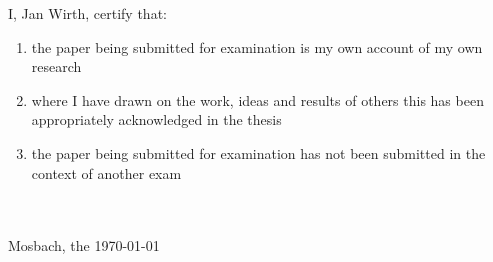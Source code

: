   
I, Jan Wirth, certify that:

\begin{enumerate}
  \item the paper being submitted for examination is my own account of my own research
  \item where I have drawn on the work, ideas and results of others this has been appropriately acknowledged in the thesis
  \item the paper being submitted for examination has not been submitted in the context of another exam
\end{enumerate}

\vspace{2cm}
\unterschrift
\\
\noindent\verfasser
\\
\noindent Mosbach, the \today
